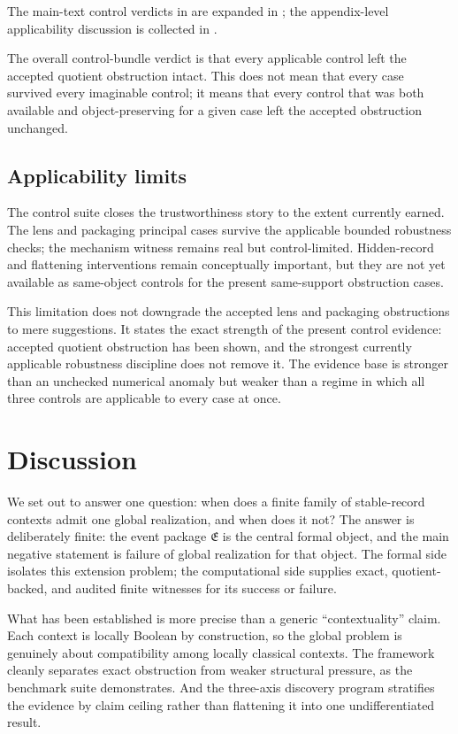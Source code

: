 \documentclass[11pt]{article}
\newcommand{\EventPackage}{\mathfrak{E}}
\theoremstyle{definition}
\begin{document}
The main-text control verdicts in  are expanded in ; the appendix-level applicability discussion is collected in .

The overall control-bundle verdict is that every applicable control left the accepted quotient obstruction intact. This does not mean that every case survived every imaginable control; it means that every control that was both available and object-preserving for a given case left the accepted obstruction unchanged.

\subsection{Applicability limits}

The control suite closes the trustworthiness story to the extent currently earned. The lens and packaging principal cases survive the applicable bounded robustness checks; the mechanism witness remains real but control-limited. Hidden-record and flattening interventions remain conceptually important, but they are not yet available as same-object controls for the present same-support obstruction cases.

This limitation does not downgrade the accepted lens and packaging obstructions to mere suggestions. It states the exact strength of the present control evidence: accepted quotient obstruction has been shown, and the strongest currently applicable robustness discipline does not remove it. The evidence base is stronger than an unchecked numerical anomaly but weaker than a regime in which all three controls are applicable to every case at once.

\section{Discussion}\label{sec:discussion}
We set out to answer one question: when does a finite family of stable-record contexts admit one global realization, and when does it not? The answer is deliberately finite: the event package \(\EventPackage\) is the central formal object, and the main negative statement is failure of global realization for that object. The formal side isolates this extension problem; the computational side supplies exact, quotient-backed, and audited finite witnesses for its success or failure.

What has been established is more precise than a generic ``contextuality'' claim. Each context is locally Boolean by construction, so the global problem is genuinely about compatibility among locally classical contexts. The framework cleanly separates exact obstruction from weaker structural pressure, as the benchmark suite demonstrates. And the three-axis discovery program stratifies the evidence by claim ceiling rather than flattening it into one undifferentiated result.
\end{document}
